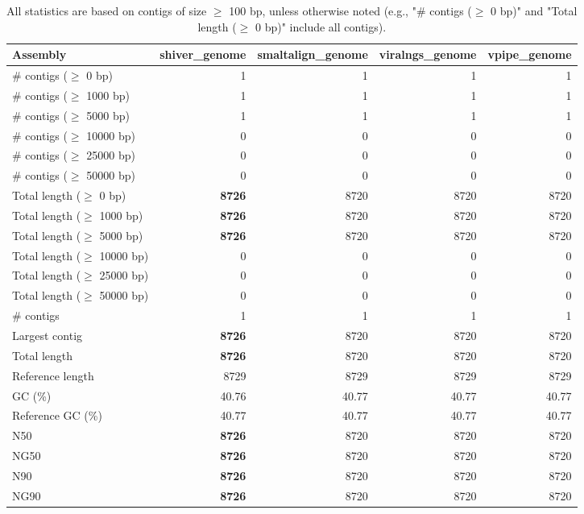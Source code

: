 \documentclass[12pt,a4paper]{article}
\begin{document}
\begin{table}[ht]
\begin{center}
\caption{All statistics are based on contigs of size $\geq$ 100 bp, unless otherwise noted (e.g., "\# contigs ($\geq$ 0 bp)" and "Total length ($\geq$ 0 bp)" include all contigs).}
\begin{tabular}{|l*{4}{|r}|}
\hline
Assembly & shiver\_genome & smaltalign\_genome & viralngs\_genome & vpipe\_genome \\ \hline
\# contigs ($\geq$ 0 bp) & 1 & 1 & 1 & 1 \\ \hline
\# contigs ($\geq$ 1000 bp) & 1 & 1 & 1 & 1 \\ \hline
\# contigs ($\geq$ 5000 bp) & 1 & 1 & 1 & 1 \\ \hline
\# contigs ($\geq$ 10000 bp) & 0 & 0 & 0 & 0 \\ \hline
\# contigs ($\geq$ 25000 bp) & 0 & 0 & 0 & 0 \\ \hline
\# contigs ($\geq$ 50000 bp) & 0 & 0 & 0 & 0 \\ \hline
Total length ($\geq$ 0 bp) & {\bf 8726} & 8720 & 8720 & 8720 \\ \hline
Total length ($\geq$ 1000 bp) & {\bf 8726} & 8720 & 8720 & 8720 \\ \hline
Total length ($\geq$ 5000 bp) & {\bf 8726} & 8720 & 8720 & 8720 \\ \hline
Total length ($\geq$ 10000 bp) & 0 & 0 & 0 & 0 \\ \hline
Total length ($\geq$ 25000 bp) & 0 & 0 & 0 & 0 \\ \hline
Total length ($\geq$ 50000 bp) & 0 & 0 & 0 & 0 \\ \hline
\# contigs & 1 & 1 & 1 & 1 \\ \hline
Largest contig & {\bf 8726} & 8720 & 8720 & 8720 \\ \hline
Total length & {\bf 8726} & 8720 & 8720 & 8720 \\ \hline
Reference length & 8729 & 8729 & 8729 & 8729 \\ \hline
GC (\%) & 40.76 & 40.77 & 40.77 & 40.77 \\ \hline
Reference GC (\%) & 40.77 & 40.77 & 40.77 & 40.77 \\ \hline
N50 & {\bf 8726} & 8720 & 8720 & 8720 \\ \hline
NG50 & {\bf 8726} & 8720 & 8720 & 8720 \\ \hline
N90 & {\bf 8726} & 8720 & 8720 & 8720 \\ \hline
NG90 & {\bf 8726} & 8720 & 8720 & 8720 \\ \hline

\end{tabular}
\end{center}
\end{table}
\end{document}
